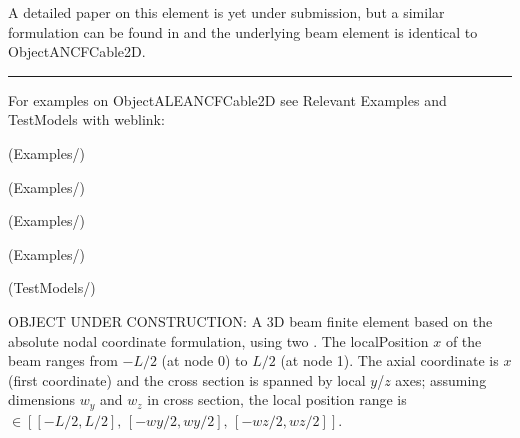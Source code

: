     A detailed paper on this element is yet under submission, but a similar formulation can be found in \cite{PechsteinGerstmayr2013ale} and 
    the underlying beam element is identical to ObjectANCFCable2D.
\vspace{6pt}\par\noindent\rule{\textwidth}{0.4pt}
%
\noindent For examples on ObjectALEANCFCable2D see Relevant Examples and TestModels with weblink:
\bi
\item {} (Examples/)
\item {} (Examples/)
\item {} (Examples/)
\item {} (Examples/)
\item {} (TestModels/)

\ei

%
\newpage


\label{sec:item:ObjectANCFBeam}
OBJECT UNDER CONSTRUCTION: A 3D beam finite element based on the absolute nodal coordinate formulation, using two . The localPosition $x$ of the beam ranges from $-L/2$ (at node 0) to $L/2$ (at node 1). The axial coordinate is $x$ (first coordinate) and the cross section is spanned by local $y$/$z$ axes; assuming dimensions $w_y$ and $w_z$ in cross section, the local position range is $\in [[-L/2,L/2],\, [-wy/2,wy/2],\, [-wz/2,wz/2] ]$.
\vspace{12pt}\\

